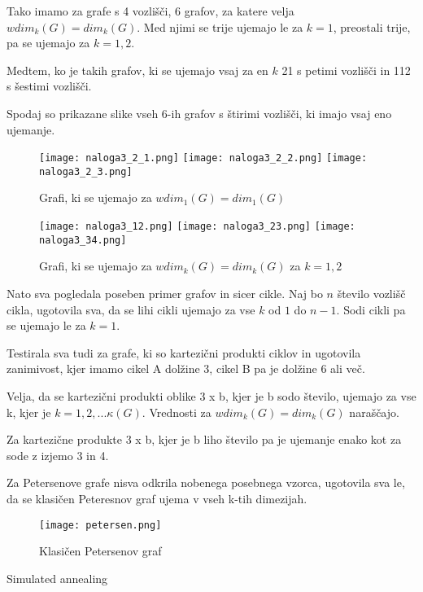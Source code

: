 \documentclass[12pt,a4paper]{amsart}
\makeatletter
\renewcommand\section{\@startsection{section}{1}%
  \z@{.5\linespacing\@plus.7\linespacing}{.5\linespacing}%
  {\normalfont\scshape\large\centering}}
\theoremstyle{plain} %
\makeatother
\begin{document}
Tako imamo za grafe s 4 vozlišči, 6 grafov, za katere velja $wdim_k(G) = dim_k(G)$.
Med njimi se trije ujemajo le za $k = 1$, preostali trije, pa se ujemajo za $k = 1,2$.

Medtem, ko je takih grafov, ki se ujemajo vsaj za en $k$ 21 s petimi vozlišči in 112 s šestimi vozlišči. 

\bigskip

Spodaj so prikazane slike vseh 6-ih grafov s štirimi vozlišči, ki imajo vsaj eno ujemanje.
\begin{figure}[h]
    \centering
    \texttt{[image: naloga3\_2\_1.png]}
    \texttt{[image: naloga3\_2\_2.png]}
    \texttt{[image: naloga3\_2\_3.png]}
    \caption{Grafi, ki se ujemajo za $wdim_1(G) = dim_1(G)$}
    \label{fig:slika1}
\end{figure}
\bigskip


\bigskip


\bigskip

\bigskip

\bigskip

\bigskip

\bigskip

\bigskip

\bigskip

\bigskip
\begin{figure}[h]
    \centering
    \texttt{[image: naloga3\_12.png]}
    \texttt{[image: naloga3\_23.png]}
    \texttt{[image: naloga3\_34.png]}
    \caption{Grafi, ki se ujemajo za $wdim_k(G)=dim_k(G)$ za $k = 1,2$}
    \label{fig:slika1}
\end{figure}

\bigskip

Nato sva pogledala poseben primer grafov in sicer cikle.
Naj bo $n$ število vozlišč cikla, ugotovila sva, da se lihi cikli ujemajo za vse $k$ od $1$ do $n - 1$.
Sodi cikli pa se ujemajo le za $k = 1$. 

Testirala sva tudi za grafe, ki so kartezični produkti ciklov in ugotovila zanimivost, kjer imamo cikel A dolžine 3, cikel B 
pa je dolžine 6 ali več.

Velja, da se kartezični produkti oblike 3 x b, kjer je b sodo število, ujemajo za vse k, kjer je
$k = 1, 2, ... \kappa(G)$. Vrednosti za $wdim_k(G)=dim_k(G)$ naraščajo.

Za kartezične produkte 3 x b, kjer je b liho število pa je ujemanje enako kot za sode z izjemo 3 in 4.

\bigskip
Za Petersenove grafe nisva odkrila nobenega posebnega vzorca, ugotovila sva le, da se klasičen Peteresnov graf
ujema v vseh k-tih dimezijah.

\begin{figure}[h]
    \centering
    \texttt{[image: petersen.png]}
    \caption{Klasičen Petersenov graf}
    \label{fig:slika1}
\end{figure}

\section{Simulated annealing}
\end{document}

